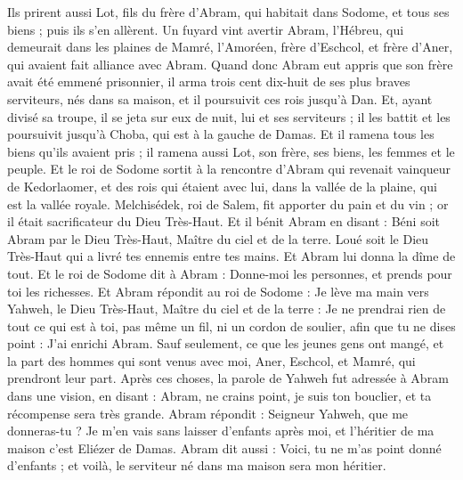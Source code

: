 \begin{multicols}{2}
Ils prirent aussi Lot, fils du frère d'Abram, qui habitait dans Sodome, et tous ses biens ; puis ils s'en allèrent.
Un fuyard vint avertir Abram, l'Hébreu, qui demeurait dans les plaines de Mamré, l'Amoréen, frère d'Eschcol, et frère d'Aner, qui avaient fait alliance avec Abram.
Quand donc Abram eut appris que son frère avait été emmené prisonnier, il arma trois cent dix-huit de ses plus braves serviteurs, nés dans sa maison, et il poursuivit ces rois jusqu'à Dan.
Et, ayant divisé sa troupe, il se jeta sur eux de nuit, lui et ses serviteurs ; il les battit et les poursuivit jusqu'à Choba, qui est à la gauche de Damas.
Et il ramena tous les biens qu'ils avaient pris ; il ramena aussi Lot, son frère, ses biens, les femmes et le peuple.
Et le roi de Sodome sortit à la rencontre d'Abram qui revenait vainqueur de Kedorlaomer, et des rois qui étaient avec lui, dans la vallée de la plaine, qui est la vallée royale.
Melchisédek, roi de Salem, fit apporter du pain et du vin ; or il était sacrificateur du Dieu Très-Haut.
Et il bénit Abram en disant : Béni soit Abram par le Dieu Très-Haut, Maître du ciel et de la terre.
Loué soit le Dieu Très-Haut qui a livré tes ennemis entre tes mains. Et Abram lui donna la dîme de tout.
Et le roi de Sodome dit à Abram : Donne-moi les personnes, et prends pour toi les richesses.
Et Abram répondit au roi de Sodome : Je lève ma main vers Yahweh, le Dieu Très-Haut, Maître du ciel et de la terre :
Je ne prendrai rien de tout ce qui est à toi, pas même un fil, ni un cordon de soulier, afin que tu ne dises point : J'ai enrichi Abram.
Sauf seulement, ce que les jeunes gens ont mangé, et la part des hommes qui sont venus avec moi, Aner, Eschcol, et Mamré, qui prendront leur part.
\VerseOne{}Après ces choses, la parole de Yahweh fut adressée à Abram dans une vision, en disant : Abram, ne crains point, je suis ton bouclier, et ta récompense sera très grande.
Abram répondit : Seigneur Yahweh, que me donneras-tu ? Je m'en vais sans laisser d'enfants après moi, et l'héritier de ma maison c'est Eliézer de Damas.
Abram dit aussi : Voici, tu ne m'as point donné d'enfants ; et voilà, le serviteur né dans ma maison sera mon héritier.

\end{multicols}

